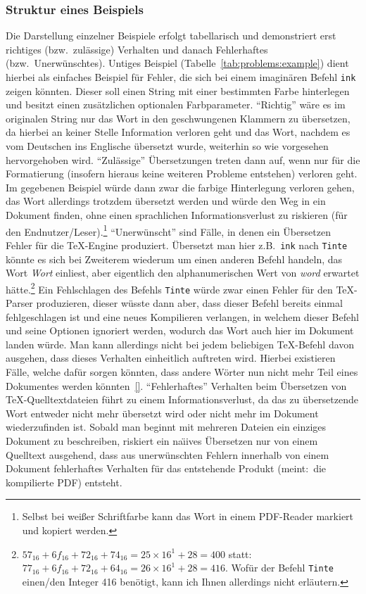 \subsubsection*{Struktur eines Beispiels}
Die Darstellung einzelner Beispiele erfolgt tabellarisch und demonstriert erst richtiges (bzw.\ zulässige) Verhalten und danach Fehlerhaftes (bzw.\ Unerwünschtes). Untiges Beispiel (Tabelle~\ref{tab:problems:example}) dient hierbei als einfaches Beispiel für Fehler, die sich bei einem imaginären Befehl \texttt{ink} zeigen könnten. Dieser soll einen String mit einer bestimmten Farbe hinterlegen und besitzt einen zusätzlichen optionalen Farbparameter. 
\enquote{Richtig} wäre es im originalen String nur das Wort in den geschwungenen Klammern zu übersetzen, da hierbei an keiner Stelle Information verloren geht und das Wort, nachdem es vom Deutschen ins Englische übersetzt wurde, weiterhin so wie vorgesehen hervorgehoben wird.
\enquote{Zulässige} Übersetzungen treten dann auf, wenn nur für die Formatierung (insofern hieraus keine weiteren Probleme entstehen) verloren geht. Im gegebenen Beispiel würde dann zwar die farbige Hinterlegung verloren gehen, das Wort allerdings trotzdem übersetzt werden und würde den Weg in ein Dokument finden, ohne einen sprachlichen Informationsverlust zu riskieren (für den Endnutzer/Leser).\footnote{Selbst bei weißer Schriftfarbe kann das Wort in einem PDF-Reader markiert und kopiert werden.}
\enquote{Unerwünscht} sind Fälle, in denen ein Übersetzen Fehler für die \TeX{}-Engine produziert. Übersetzt man hier z.B.\ \texttt{ink} nach \texttt{Tinte} könnte es sich bei Zweiterem wiederum um einen anderen Befehl handeln, das Wort \textit{Wort} einliest, aber eigentlich den alphanumerischen Wert von \textit{word} erwartet hätte.\footnote{$57_{16}+6f_{16} + 72_{16} + 74_{16} = 25\times 16^1 + 28 = 400$ statt:\ $77_{16}+6f_{16} + 72_{16} + 64_{16} = 26\times 16^1 + 28 = 416$. Wofür der Befehl \texttt{Tinte} einen/den Integer 416 benötigt, kann ich Ihnen allerdings nicht erläutern.} Ein Fehlschlagen des Befehls \texttt{Tinte} würde zwar einen Fehler für den \TeX{}-Parser produzieren, dieser wüsste dann aber, dass dieser Befehl bereits einmal fehlgeschlagen ist und eine neues Kompilieren verlangen, in welchem dieser Befehl und seine Optionen ignoriert werden, wodurch das Wort auch hier im Dokument landen würde. Man kann allerdings nicht bei jedem beliebigen \TeX{}-Befehl davon ausgehen, dass dieses Verhalten einheitlich auftreten wird. Hierbei existieren Fälle, welche dafür sorgen könnten, dass andere Wörter nun nicht mehr Teil eines Dokumentes werden könnten~\ref{}.%
\enquote{Fehlerhaftes} Verhalten beim Übersetzen von \TeX{}-Quelltextdateien führt zu einem Informationsverlust, da das zu übersetzende Wort entweder nicht mehr übersetzt wird oder nicht mehr im Dokument wiederzufinden ist. Sobald man beginnt mit mehreren Dateien ein einziges Dokument zu beschreiben, riskiert ein na\"\i ives Übersetzen nur von einem Quelltext ausgehend, dass aus unerwünschten Fehlern innerhalb von einem Dokument fehlerhaftes Verhalten für das entstehende Produkt (meint:\ die kompilierte PDF) entsteht. 


